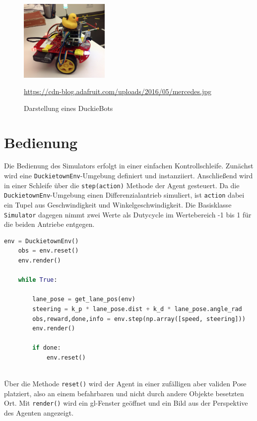 \begin{figure}[H]
	\centering
	\includegraphics[width=0.385\textwidth]{kapitel2/images/duckiebot.jpg}
	\label{fig:duckiebot}
	\caption{Darstellung eines DuckieBots}
	\vspace{0.2cm}
	\quelle\url{https://cdn-blog.adafruit.com/uploads/2016/05/mercedes.jpg}
\end{figure}


\section{Bedienung}

Die Bedienung des Simulators erfolgt in einer einfachen Kontrollschleife. Zunächst wird eine \texttt{DuckietownEnv}-Umgebung definiert und instanziiert. Anschließend wird in einer Schleife über die \texttt{step(action)} Methode der Agent gesteuert. Da die  \texttt{DuckietownEnv}-Umgebung einen Differenzialantrieb simuliert, ist \texttt{action} dabei ein Tupel aus Geschwindigkeit und Winkelgeschwindigkeit. Die Basisklasse \texttt{Simulator} dagegen nimmt zwei Werte als Dutycycle im Wertebereich -1 bis 1 für die beiden Antriebe entgegen.

\begin{minipage}{\linewidth}
	\begin{lstlisting}[caption={Bedienung einer DuckieTown-Umgebung}, language=Python]
	env = DuckietownEnv()
	obs = env.reset()
	env.render()
	
	while True:
		
		lane_pose = get_lane_pos(env)
		steering = k_p * lane_pose.dist + k_d * lane_pose.angle_rad
		obs,reward,done,info = env.step(np.array([speed, steering]))
		env.render()
		
		if done:
			env.reset()
	
	\end{lstlisting}
\end{minipage}

Über die Methode \texttt{reset()} wird der Agent in einer zufälligen aber validen Pose platziert, also an einem befahrbaren und nicht durch andere Objekte besetzten Ort. Mit \texttt{render()} wird ein \acs{gl}-Fenster geöffnet und ein Bild aus der Perspektive des Agenten angezeigt.\\

